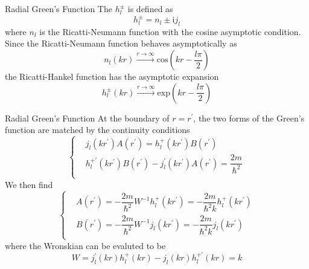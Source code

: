 \documentclass{beamer}
\begin{document}
	\begin{frame}{Radial Green's Function}
		The $h_l^\pm$ is defined as
		\begin{equation}
			h_l^\pm = n_l\pm\mathrm{i}j_l
		\end{equation}
		where $n_l$ is the Ricatti-Neumann function with the cosine asymptotic condition. Since the Ricatti-Neumann function behaves asymptotically as
		\begin{equation}
			n_l(kr)\stackrel{r\rightarrow\infty}{\longrightarrow}\mathrm{cos}(kr-\dfrac{l\pi}{2})
		\end{equation}
		the Ricatti-Hankel function has the asymptotic expansion
		\begin{equation}
			h_l^\pm(kr)\stackrel{r\rightarrow\infty}{\longrightarrow}\mathrm{exp}\left( kr-\dfrac{l\pi}{2}\right) 
		\end{equation}
	\end{frame}
	\begin{frame}{Radial Green's Function}
		At the boundary of $r=r^\prime$, the two forms of the Green's function are matched by the continuity conditions
		\begin{equation}
			\left\{
			\begin{aligned}
				&j_l(kr^\prime)A(r^\prime)=h_l^+(kr^\prime)B(r^\prime)\\
				&h_l^{+\prime}(kr^\prime)B(r^\prime)-j_l^\prime(kr^\prime)A(r^\prime)=\dfrac{2m}{\hbar^2}\\
			\end{aligned}
			\right
			.
		\end{equation}
		We then find
		\begin{equation}
			\left\{
			\begin{aligned}
				&A(r^\prime)=-\dfrac{2m}{\hbar^2}W^{-1}h_l^+(kr^\prime)=-\dfrac{2m}{\hbar^2k}h_l^+(kr^\prime)\\
				&B(r^\prime)=-\dfrac{2m}{\hbar^2}W^{-1}j_l(kr^\prime)=-\dfrac{2m}{\hbar^2k}j_l(kr^\prime)\\
			\end{aligned}
			\right
			.
		\end{equation}
		where the Wronskian can be evaluted to be
		\begin{equation}
			W=j_l^\prime(kr)h_l^+(kr)-j_l(kr)h_l^{+\prime}(kr)=k
		\end{equation}
	\end{frame}
\end{document}
